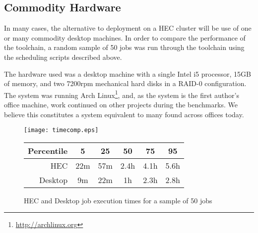 


\subsection{Commodity Hardware}
In many cases, the alternative to deployment on a HEC cluster will be use of one or many commodity desktop machines.  In order to compare the performance of the toolchain, a random sample of 50 jobs was run through the toolchain using the scheduling scripts described above.

The hardware used was a desktop machine with a single Intel i5 processor, 15GB of memory, and two 7200rpm mechanical hard disks in a RAID-0 configuration.  The system was running Arch Linux\footnote{\url{http://archlinux.org}}, and, as the system is the first author's office machine, work continued on other projects during the benchmarks.  We believe this constitutes a system equivalent to many found across offices today.

\begin{figure}[h]
    \centering
    \texttt{[image: timecomp.eps]}


    \begin{tabular}{ | r | c | c | c | c | c | }
        \hline
        Percentile & 5 & 25 & 50 & 75 & 95 \\ \hline
        HEC        & 22m & 57m & 2.4h & 4.1h & 5.6h \\ \hline
        Desktop    & 9m & 22m & 1h & 2.3h & 2.8h \\ \hline
    \end{tabular}

    \caption{HEC and Desktop job execution times for a sample of 50 jobs}
    \label{fig:timecomp}
\end{figure}


